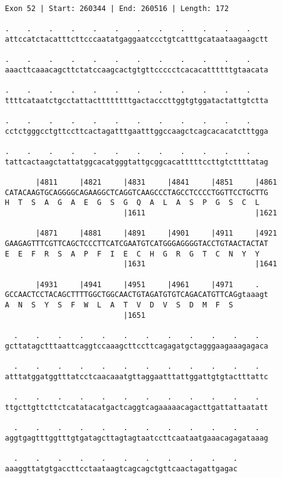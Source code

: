 \documentclass{article}
\begin{document}
\begin{Verbatim}[fontfamily=courier]
Exon 52 | Start: 260344 | End: 260516 | Length: 172

.    .    .    .    .    .    .    .    .    .    .    .    
attccatctacatttcttcccaatatgaggaatccctgtcatttgcataataagaagctt

.    .    .    .    .    .    .    .    .    .    .    .    
aaacttcaaacagcttctatccaagcactgtgttccccctcacacattttttgtaacata

.    .    .    .    .    .    .    .    .    .    .    .    
ttttcataatctgcctattacttttttttgactacccttggtgtggatactattgtctta

.    .    .    .    .    .    .    .    .    .    .    .    
cctctgggcctgttccttcactagatttgaatttggccaagctcagcacacatctttgga

.    .    .    .    .    .    .    .    .    .    .    .    
tattcactaagctattatggcacatgggtattgcggcacatttttccttgtcttttatag

       |4811     |4821     |4831     |4841     |4851     |4861
CATACAAGTGCAGGGGCAGAAGGCTCAGGTCAAGCCCTAGCCTCCCCTGGTTCCTGCTTG
H  T  S  A  G  A  E  G  S  G  Q  A  L  A  S  P  G  S  C  L  
                           |1611                         |1621

       |4871     |4881     |4891     |4901     |4911     |4921
GAAGAGTTTCGTTCAGCTCCCTTCATCGAATGTCATGGGAGGGGTACCTGTAACTACTAT
E  E  F  R  S  A  P  F  I  E  C  H  G  R  G  T  C  N  Y  Y  
                           |1631                         |1641

       |4931     |4941     |4951     |4961     |4971     .  
GCCAACTCCTACAGCTTTTGGCTGGCAACTGTAGATGTGTCAGACATGTTCAGgtaaagt
A  N  S  Y  S  F  W  L  A  T  V  D  V  S  D  M  F  S        
                           |1651                            

  .    .    .    .    .    .    .    .    .    .    .    .  
gcttatagctttaattcaggtccaaagcttccttcagagatgctagggaagaaagagaca

  .    .    .    .    .    .    .    .    .    .    .    .  
atttatggatggtttatcctcaacaaatgttaggaatttattggattgtgtactttattc

  .    .    .    .    .    .    .    .    .    .    .    .  
ttgcttgttcttctcatatacatgactcaggtcagaaaaacagacttgattattaatatt

  .    .    .    .    .    .    .    .    .    .    .    .  
aggtgagtttggtttgtgatagcttagtagtaatccttcaataatgaaacagagataaag

  .    .    .    .    .    .    .    .    .    .    .
aaaggttatgtgaccttcctaataagtcagcagctgttcaactagattgagac
\end{Verbatim}
\end{document}
